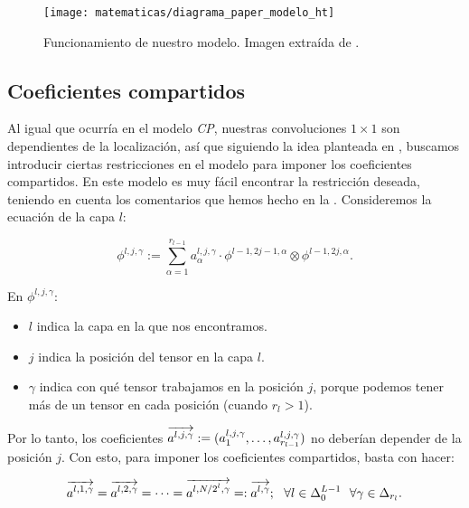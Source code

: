 \begin{figure}[H]
	\centering
	\texttt{[image: matematicas/diagrama\_paper\_modelo\_ht]}
	\caption{Funcionamiento de nuestro modelo. Imagen extraída de \cite{matematicas:principal}.}
\end{figure}

\subsection{Coeficientes compartidos}

Al igual que ocurría en el modelo \textit{CP}, nuestras convoluciones $1 \times 1$ son dependientes de la localización, así que siguiendo la idea planteada en , buscamos introducir ciertas restricciones en el modelo para imponer los coeficientes compartidos. En este modelo es muy fácil encontrar la restricción deseada, teniendo en cuenta los comentarios que hemos hecho en la . Consideremos la ecuación de la capa $l$:

\begin{equation}
	\phi^{l, j, \gamma} := \sum_{\alpha = 1}^{r_{l-1}} a_{\alpha}^{l, j, \gamma} \cdot \phi^{l-1, 2j-1, \alpha} \otimes \phi^{l-1, 2j, \alpha}.
\end{equation}

En $\phi^{l, j, \gamma}$:

\begin{itemize}
	\item $l$ indica la capa en la que nos encontramos.
	\item $j$ indica la posición del tensor en la capa $l$.
	\item $\gamma$ indica con qué tensor trabajamos en la posición $j$, porque podemos tener más de un tensor en cada posición (cuando $r_l > 1$).
\end{itemize}

Por lo tanto, los coeficientes $\overrightarrow{a^{l, j, \gamma}} := (a^{l, j, \gamma}_1, \ldots, a^{l, j, \gamma}_{r_{l-1}})$ no deberían depender de la posición $j$. Con esto, para imponer los coeficientes compartidos, basta con hacer:

\begin{equation}
	\overrightarrow{a^{l, 1, \gamma}} = \overrightarrow{a^{l, 2, \gamma}} = \cdots = \overrightarrow{a^{l, N/2^l, \gamma}} =: \overrightarrow{a^{l, \gamma}}; \ \  \forall l \in \Delta_{0}^{L - 1} \ \  \forall \gamma \in \Delta_{r_l}.
\end{equation}

